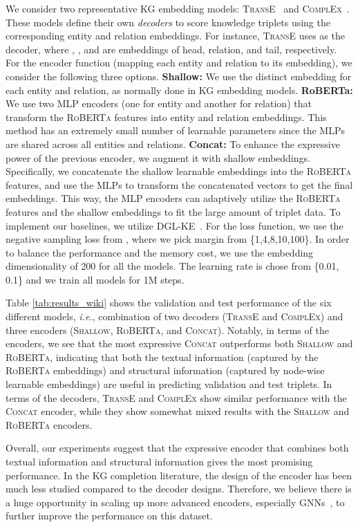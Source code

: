 \documentclass{article}
\newcommand{\ie}{\textit{i.e.}}
\begin{document}
{
We consider two representative KG embedding models: \textsc{TransE}~\cite{bordes2013translating} and \textsc{ComplEx}~\cite{trouillon2016complex}.
These models define their own \emph{decoders} to score knowledge triplets using the corresponding entity and relation embeddings. For instance, \textsc{TransE} uses  as the decoder, where , , and  are embeddings of head, relation, and tail, respectively.
For the encoder function (mapping each entity and relation to its embedding), we consider the following three options.
\textbf{Shallow:} We use the distinct embedding for each entity and relation, as normally done in KG embedding models.
\textbf{RoBERTa:} We use two MLP encoders (one for entity and another for relation) that transform the \textsc{RoBERTa} features into entity and relation embeddings. This method has an extremely small number of learnable parameters since the MLPs are shared across all entities and relations. 
\textbf{Concat:} To enhance the expressive power of the previous encoder, we augment it with shallow embeddings.
Specifically, we concatenate the shallow learnable embeddings into the \textsc{RoBERTa} features, and use the MLPs to transform the concatenated vectors to get the final embeddings. This way, the MLP encoders can adaptively utilize the \textsc{RoBERTa} features and the shallow embeddings to fit the large amount of triplet data.
To implement our baselines, we utilize DGL-KE~\cite{zheng2020dgl}.
}
{
For the loss function, we use the negative sampling loss from \citet{sun2019rotate}, where we pick margin  from \{1,4,8,10,100\}. In order to balance the performance and the memory cost, we use the embedding dimensionality of 200 for all the models. The learning rate is chose from \{0.01, 0.1\} and we train all models for 1M steps.
}
{
 Table \ref{tab:results_wiki} shows the validation and test performance of the six different models, \ie, combination of two decoders (\textsc{TransE} and \textsc{ComplEx}) and three encoders (\textsc{Shallow}, \textsc{RoBERTa}, and \textsc{Concat}). Notably, in terms of the encoders, we see that the most expressive \textsc{Concat} outperforms both \textsc{Shallow} and \textsc{RoBERTa}, indicating that both the textual information (captured by the \textsc{RoBERTa} embeddings) and structural information (captured by node-wise learnable embeddings) are useful in predicting validation and test triplets. In terms of the decoders, \textsc{TransE} and \textsc{ComplEx} show similar performance with the \textsc{Concat} encoder, while they show somewhat mixed results with the \textsc{Shallow} and \textsc{RoBERTa} encoders.
 
Overall, our experiments suggest that the expressive encoder that combines both textual information and structural information gives the most promising performance.
In the KG completion literature, the design of the encoder has been much less studied compared to the decoder designs. Therefore, we believe there is a huge opportunity in scaling up more advanced encoders, especially GNNs~\citep{schlichtkrull2018modeling}, to further improve the performance on this dataset.
}
\end{document}
